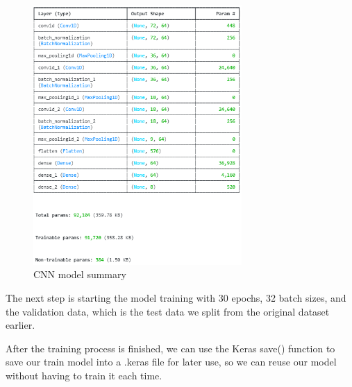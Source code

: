 \begin{figure}[h]
	\centering
	\includegraphics[width=300px]{figures/CNN_model_summary.png}
	\caption{CNN model summary}
	\label{fig:test}
\end{figure}


The next step is starting the model training with 30 epochs, 32 batch sizes, and the validation data, which is the test data we split from the original dataset earlier.





After the training process is finished, we can use the Keras save() function to save our train model into a .keras file for later use, so we can reuse our model without having to train it each time.

















